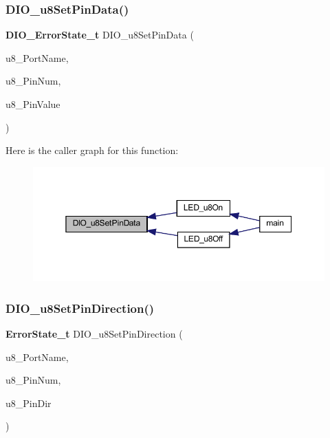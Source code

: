 \subsubsection{D\+I\+O\+\_\+u8\+Set\+Pin\+Data()}
{\footnotesize\ttfamily \textbf{ D\+I\+O\+\_\+\+Error\+State\+\_\+t} D\+I\+O\+\_\+u8\+Set\+Pin\+Data (\begin{DoxyParamCaption}\item[{\textbf{ D\+I\+O\+Port\+\_\+t}}]{u8\+\_\+\+Port\+Name,  }\item[{\textbf{ D\+I\+O\+Pin\+\_\+t}}]{u8\+\_\+\+Pin\+Num,  }\item[{\textbf{ uint8\+\_\+t}}]{u8\+\_\+\+Pin\+Value }\end{DoxyParamCaption})}

Here is the caller graph for this function\+:\nopagebreak
\begin{figure}[H]
\begin{center}
\leavevmode
\includegraphics[width=350pt]{_d_i_o_8c_a5d5a58f8379f5708eb64eae7d5b059ca_icgraph}
\end{center}
\end{figure}
\mbox{\label{_d_i_o_8c_ad16a829fb6b44a4a9a3ab4d57401a4fc}} 
\subsubsection{D\+I\+O\+\_\+u8\+Set\+Pin\+Direction()}
{\footnotesize\ttfamily \textbf{ Error\+State\+\_\+t} D\+I\+O\+\_\+u8\+Set\+Pin\+Direction (\begin{DoxyParamCaption}\item[{\textbf{ D\+I\+O\+Port\+\_\+t}}]{u8\+\_\+\+Port\+Name,  }\item[{\textbf{ D\+I\+O\+Pin\+\_\+t}}]{u8\+\_\+\+Pin\+Num,  }\item[{\textbf{ D\+I\+O\+Dir\+\_\+t}}]{u8\+\_\+\+Pin\+Dir }\end{DoxyParamCaption})}



